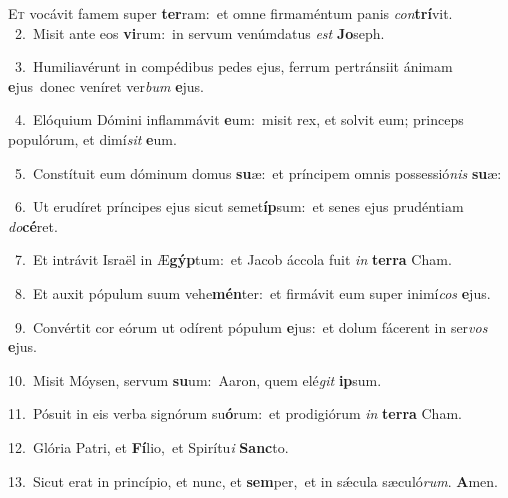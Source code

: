 \lettrine{\initial\textcolor{\initialcolor}{E}}{t} vocávit famem super \textbf{ter}\-ram:~\star et omne firmaméntum panis \textit{con}\-\textbf{trí}vit.\\
{\numbfont\textcolor{\numbcolor}{~2.}}~Misit ante eos \textbf{vi}\-rum:~\star in servum venúmdatus \textit{est} \textbf{Jo}\-seph.\par
{\numbfont\textcolor{\numbcolor}{~3.}}~Humiliavérunt in compédibus pedes ejus, ferrum pertránsiit ánimam \textbf{e}\-jus~\star donec veníret ver\textit{bum} \textbf{e}\-jus.\par
{\numbfont\textcolor{\numbcolor}{~4.}}~Elóquium Dómini inflammávit \textbf{e}\-um:~\star misit rex, et solvit eum; princeps populórum, et dimí\textit{sit} \textbf{e}\-um.\par
{\numbfont\textcolor{\numbcolor}{~5.}}~Constítuit eum dóminum domus \textbf{su}\-æ:~\star et príncipem omnis possessió\textit{nis} \textbf{su}\-æ:\par
{\numbfont\textcolor{\numbcolor}{~6.}}~Ut erudíret príncipes ejus sicut semet\-\textbf{íp}\-sum:~\star et senes ejus prudéntiam \textit{do}\-\textbf{cé}ret.\par
{\numbfont\textcolor{\numbcolor}{~7.}}~Et intrávit Israël in Æ\-\textbf{gýp}\-tum:~\star et Jacob áccola fuit \textit{in} \textbf{ter}\-\textbf{ra} Cham.\par
{\numbfont\textcolor{\numbcolor}{~8.}}~Et auxit pópulum suum vehe\-\textbf{mén}\-ter:~\star et firmávit eum super inimí\textit{cos} \textbf{e}\-jus.\par
{\numbfont\textcolor{\numbcolor}{~9.}}~Convértit cor eórum ut odírent pópulum \textbf{e}\-jus:~\star et dolum fácerent in ser\textit{vos} \textbf{e}\-jus.\par
{\numbfont\textcolor{\numbcolor}{10.}}~Misit Móysen, servum \textbf{su}\-um:~\star Aaron, quem elé\textit{git} \textbf{ip}\-sum.\par
{\numbfont\textcolor{\numbcolor}{11.}}~Pósuit in eis verba signórum su\-\textbf{ó}\-rum:~\star et prodigiórum \textit{in} \textbf{ter}\-\textbf{ra} Cham.\par
{\numbfont\textcolor{\numbcolor}{12.}}~Glória Patri, et \textbf{Fí}\-lio,~\star et Spirítu\textit{i} \textbf{Sanc}\-to.\par
{\numbfont\textcolor{\numbcolor}{13.}}~Sicut erat in princípio, et nunc, et \textbf{sem}\-per,~\star et in sǽcula sæculó\-\textit{rum}\-. \textbf{A}\-men.\par
